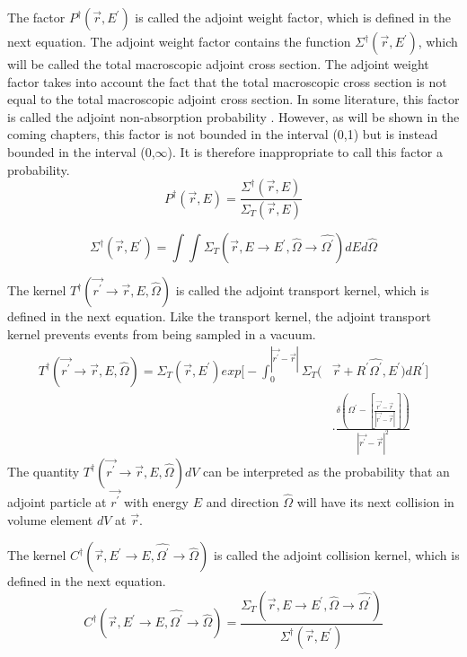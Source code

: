 The factor $P^{\dagger}(\vec{r},E^{'})$ is called the adjoint weight factor, which
is defined in the next equation. The adjoint weight factor contains the 
function $\Sigma^{\dagger}(\vec{r},E^{'})$, which will be called the total
macroscopic adjoint cross section. The adjoint weight factor takes into account 
the fact that the total macroscopic cross section is not equal to the total 
macroscopic adjoint cross section. In some literature, this factor is called 
the adjoint non-absorption probability \citep{gabler_amos_2006}. However, as 
will be shown in the coming chapters, this factor is not bounded in the 
interval (0,1) but is instead bounded in the interval (0,$\infty$). It is 
therefore inappropriate to call this factor a probability.
\begin{equation}
  P^{\dagger}(\vec{r},E) = \frac{\Sigma^{\dagger}(\vec{r},E)}
  {\Sigma_T(\vec{r},E)}
\end{equation}

\begin{equation}
  \Sigma^{\dagger}(\vec{r},E^{'}) = \int\int 
  \Sigma_T(\vec{r},E \to E^{'},\hat{\Omega} \to \hat{\Omega^{'}}) dEd\hat{\Omega}
  \label{eq:total_adjoint_cross_section}
\end{equation}

The kernel $T^{\dagger}(\vec{r^{'}} \to \vec{r},E,\hat{\Omega})$ is called
the adjoint transport kernel, which is defined in the next equation. Like the
transport kernel, the adjoint transport kernel prevents events from being
sampled in a vacuum.
\begin{equation}
  \begin{split}
  T^{\dagger}(\vec{r^{'}} \to \vec{r},E,\hat{\Omega}) = 
  \Sigma_T(\vec{r},E^{'}) exp\Big[-\int_0^{|\vec{r^{'}} - \vec{r}|} 
      \Sigma_T(&\vec{r}+R^{'}\hat{\Omega^{'}},E^{'})dR^{'} \Big] \\
    & \cdot \frac{\delta \left(\Omega^{'} - \left[\frac{\vec{r^{'}} - \vec{r}}
        {|\vec{r^{'}} - \vec{r}|}\right]\right)}
    {|\vec{r^{'}} - \vec{r}|^2}
  \end{split}
\end{equation}
The quantity $T^{\dagger}(\vec{r^{'}} \to \vec{r},E,\hat{\Omega})dV$ can be
interpreted as the probability that an adjoint particle at $\vec{r^{'}}$ with
energy $E$ and direction $\hat{\Omega}$ will have its next collision in volume
element $dV$ at $\vec{r}$.

The kernel $C^{\dagger}(\vec{r},E^{'} \to E,\hat{\Omega^{'}} \to \hat{\Omega})$ is
called the adjoint collision kernel, which is defined in the next equation.
\begin{equation}
  C^{\dagger}(\vec{r},E^{'} \to E,\hat{\Omega^{'}} \to \hat{\Omega}) = 
  \frac{\Sigma_T(\vec{r},E \to E^{'},\hat{\Omega} \to \hat{\Omega^{'}})}
       {\Sigma^{\dagger}(\vec{r},E^{'})}
  \label{eq:adj_collision_kernel}
\end{equation}

